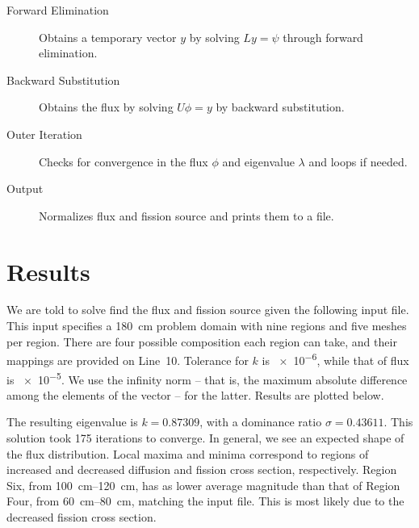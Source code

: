 \documentclass[fleqn,11pt]{article}
\begin{document}
\begin{description}
  \item [Forward Elimination] Obtains a temporary vector \(y\) by solving \(L y = \psi\) through forward elimination.
  
  \item [Backward Substitution] Obtains the flux by solving \(U \phi = y\) by backward substitution.
  
  \item [Outer Iteration] Checks for convergence in the flux \(\phi\) and eigenvalue \(\lambda\) and loops if needed.
  
  \item [Output] Normalizes flux and fission source and prints them to a file.
\end{description}

\section{Results}
We are told to solve find the flux and fission source given 
the following input file. This input specifies a \SI{180}{\centi\meter}
problem domain with nine regions and five meshes per region.
There are four possible composition each region can take,
and their mappings are provided on Line~10. Tolerance for 
\(k\) is \num{e-6}, while that of flux is \num{e-5}. We use 
the infinity norm -- that is, the maximum absolute difference 
among the elements of the vector -- for the latter. Results 
are plotted below.



The resulting eigenvalue is \(k = 0.87309\), with a dominance
ratio \(\sigma = 0.43611\). This solution took 175 iterations
to converge. In general, we see an expected shape of the 
flux distribution. Local maxima and minima correspond to 
regions of increased and decreased diffusion and fission 
cross section, respectively. Region Six, from 
\SIrange{100}{120}{\centi\meter}, has as lower average 
magnitude than that of Region Four, from 
\SIrange{60}{80}{\centi\meter}, matching the input file. 
This is most likely due to the decreased fission cross 
section.

\begin{center}
\end{center}
\end{document}
